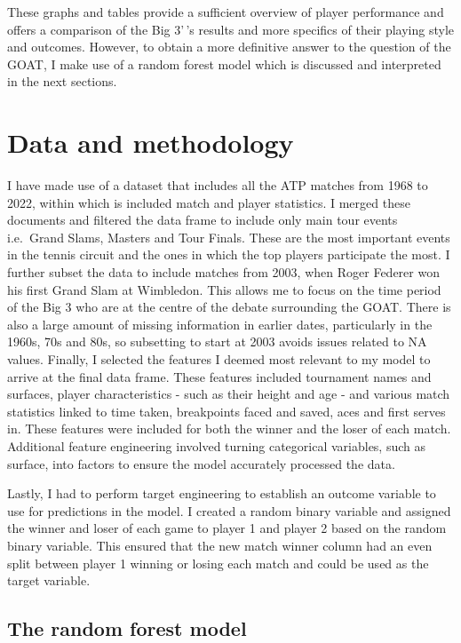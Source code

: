 \documentclass[11pt,preprint, authoryear]{elsarticle}
\numberwithin{equation}{section}
\numberwithin{figure}{section}
\numberwithin{table}{section}
\begin{document}
These graphs and tables provide a sufficient overview of player
performance and offers a comparison of the Big 3'\,'s results and more
specifics of their playing style and outcomes. However, to obtain a more
definitive answer to the question of the GOAT, I make use of a random
forest model which is discussed and interpreted in the next sections.

\hypertarget{data-and-methodology}{%
\section{Data and methodology}\label{data-and-methodology}}

I have made use of a dataset that includes all the ATP matches from 1968
to 2022, within which is included match and player statistics. I merged
these documents and filtered the data frame to include only main tour
events i.e.~Grand Slams, Masters and Tour Finals. These are the most
important events in the tennis circuit and the ones in which the top
players participate the most. I further subset the data to include
matches from 2003, when Roger Federer won his first Grand Slam at
Wimbledon. This allows me to focus on the time period of the Big 3 who
are at the centre of the debate surrounding the GOAT. There is also a
large amount of missing information in earlier dates, particularly in
the 1960s, 70s and 80s, so subsetting to start at 2003 avoids issues
related to NA values. Finally, I selected the features I deemed most
relevant to my model to arrive at the final data frame. These features
included tournament names and surfaces, player characteristics - such as
their height and age - and various match statistics linked to time
taken, breakpoints faced and saved, aces and first serves in. These
features were included for both the winner and the loser of each match.
Additional feature engineering involved turning categorical variables,
such as surface, into factors to ensure the model accurately processed
the data.

Lastly, I had to perform target engineering to establish an outcome
variable to use for predictions in the model. I created a random binary
variable and assigned the winner and loser of each game to player 1 and
player 2 based on the random binary variable. This ensured that the new
match winner column had an even split between player 1 winning or losing
each match and could be used as the target variable.

\hypertarget{the-random-forest-model}{%
\subsection{The random forest model}\label{the-random-forest-model}}
\end{document}
